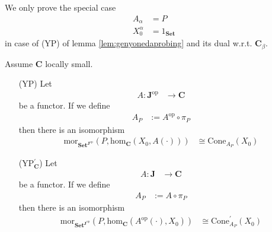 We only prove the special case
\begin{align*}
  A_{\alpha}
  &=
  P
  \\
  X_{0}^{\alpha}
  &=
  1_{\mathbf{Set}}
\end{align*}
in case of (YP) of lemma \ref{lem:genyonedaprobing} and its dual w.r.t. $\mathbf{C}_{\beta}$.
\\
\begin{lem}
\label{lem:elemyonedaprobing}
Assume $\mathbf{C}$ locally small.
\begin{enumerate}
\item[(YP)]
Let
\begin{align*}
  A
  \colon
  \mathbf{J}^{\textrm{op}}
  &\rightarrow
  \mathbf{C}
\end{align*}
be a functor. If we define
\begin{align*}
  A_{P}
  &:=
  A^{\textrm{op}}
  \circ
  \pi_{P}
\end{align*}
then there is an isomorphism
\begin{align*}
  \mathrm{mor}_{\mathbf{Set}^{\mathbf{J}^{\textrm{op}}}}
  \left(
    P,
    \mathrm{hom}_{\mathbf{C}}
    \left(
      X_{0},
      A(\cdot)
    \right)
  \right)
  &\cong
  \mathrm{Cone}_{A_{P}}(X_{0})
\end{align*}
\item[(YP$_{\mathbf{C}}^{\prime}$)]
Let
\begin{align*}
  A
  \colon
  \mathbf{J}
  &\rightarrow
  \mathbf{C}
\end{align*}
be a functor. If we define
\begin{align*}
  A_{P}
  &:=
  A
  \circ
  \pi_{P}
\end{align*}
then there is an isomorphism
\begin{align*}
  \mathrm{mor}_{\mathbf{Set}^{\mathbf{J}^{\textrm{op}}}}
  \left(
    P,
    \mathrm{hom}_{\mathbf{C}}
    \left(
      A^{\textrm{op}}(\cdot),
      X_{0}
    \right)
  \right)
  &\cong
  \mathrm{Cone}_{A_{P}}^{\prime}(X_{0})
\end{align*}
\end{enumerate}
\end{lem}
